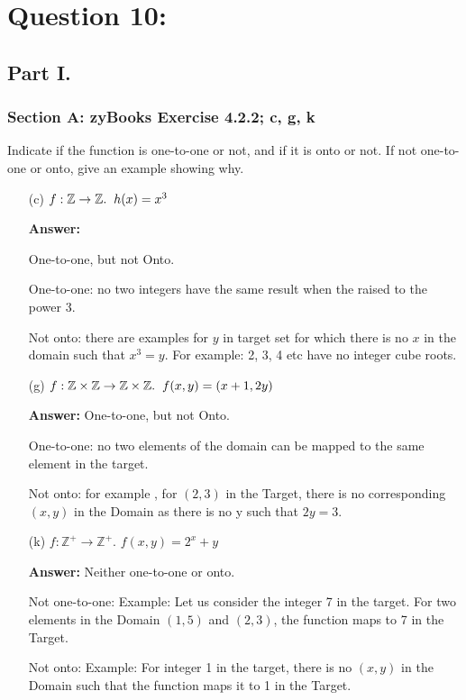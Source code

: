 \documentclass[14pt]{extreport}
\newcommand{\answer}[0]{\medskip \textbf{Answer:} \medskip}
\newcommand{\Z}[0]{\mathbb{Z}}
\begin{document}
\section*{Question 10:}

\subsection*{Part I.}

\subsubsection*{Section A: zyBooks Exercise 4.2.2; c, g, k}
    
Indicate if the function is one-to-one or not, and if it is onto or not. If not one-to-one or onto, give an example showing why. 

\begin{enumerate}
    \item[(c)] $f: \Z \to \Z. \hspace{2mm} h(x) = x^{3}$
    
        \answer

            One-to-one, but not Onto.
            
            One-to-one: no two integers have the same result when the raised to the power 3. 
            
            Not onto: there are examples for $y$ in target set for which there is no $x$ in the domain such that $x^{3} = y$. For example: 2, 3, 4 etc have no integer cube roots.
    \newline
    \item[(g)] $f: \Z \times \Z \to \Z \times \Z. \hspace{2mm} f(x,y) = (x+1, 2y)$
    
        \answer
        One-to-one, but not Onto. 
        
        One-to-one: no two elements of the domain can be mapped to the same element in the target. 
        
        Not onto: for example , for $\left(2,3\right)$ in the Target, there is no corresponding $\left(x,y\right)$ in the Domain as there is no y such that $2y = 3$. 
    \newline
    
    \item[(k)] $f:\Z^{+} \to \Z^{+}$.\hspace{1mm} $f(x,y) = 2^{x} + y$
    
        \answer
        Neither one-to-one or onto. 
        
        Not one-to-one: Example: Let us consider the integer 7 in the target. For two elements in the Domain $\left(1,5\right)$ and $\left(2,3\right)$, the function maps to 7 in the Target. 
        
        Not onto: Example: For integer 1 in the target, there is no $\left(x,y\right)$ in the Domain such that the function maps it to 1 in the Target. 

\end{enumerate}
\end{document}
